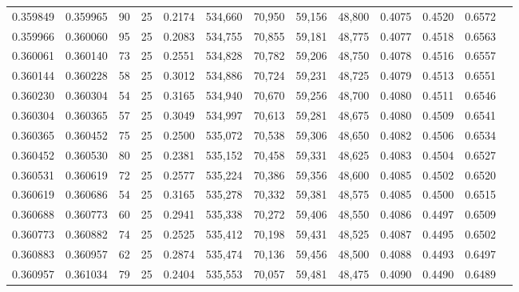 \begin{tabular}{rrrrrrrrrrrrr}
0.359849 & 0.359965 &    90 &  25 &                                     0.2174 & 534,660 &  70,950 &  59,156 &  48,800 & 0.4075 & 0.4520 & 0.6572 \\
0.359966 & 0.360060 &    95 &  25 &                                     0.2083 & 534,755 &  70,855 &  59,181 &  48,775 & 0.4077 & 0.4518 & 0.6563 \\
0.360061 & 0.360140 &    73 &  25 &                                     0.2551 & 534,828 &  70,782 &  59,206 &  48,750 & 0.4078 & 0.4516 & 0.6557 \\
0.360144 & 0.360228 &    58 &  25 &                                     0.3012 & 534,886 &  70,724 &  59,231 &  48,725 & 0.4079 & 0.4513 & 0.6551 \\
0.360230 & 0.360304 &    54 &  25 &                                     0.3165 & 534,940 &  70,670 &  59,256 &  48,700 & 0.4080 & 0.4511 & 0.6546 \\
0.360304 & 0.360365 &    57 &  25 &                                     0.3049 & 534,997 &  70,613 &  59,281 &  48,675 & 0.4080 & 0.4509 & 0.6541 \\
0.360365 & 0.360452 &    75 &  25 &                                     0.2500 & 535,072 &  70,538 &  59,306 &  48,650 & 0.4082 & 0.4506 & 0.6534 \\
0.360452 & 0.360530 &    80 &  25 &                                     0.2381 & 535,152 &  70,458 &  59,331 &  48,625 & 0.4083 & 0.4504 & 0.6527 \\
0.360531 & 0.360619 &    72 &  25 &                                     0.2577 & 535,224 &  70,386 &  59,356 &  48,600 & 0.4085 & 0.4502 & 0.6520 \\
0.360619 & 0.360686 &    54 &  25 &                                     0.3165 & 535,278 &  70,332 &  59,381 &  48,575 & 0.4085 & 0.4500 & 0.6515 \\
0.360688 & 0.360773 &    60 &  25 &                                     0.2941 & 535,338 &  70,272 &  59,406 &  48,550 & 0.4086 & 0.4497 & 0.6509 \\
0.360773 & 0.360882 &    74 &  25 &                                     0.2525 & 535,412 &  70,198 &  59,431 &  48,525 & 0.4087 & 0.4495 & 0.6502 \\
0.360883 & 0.360957 &    62 &  25 &                                     0.2874 & 535,474 &  70,136 &  59,456 &  48,500 & 0.4088 & 0.4493 & 0.6497 \\
0.360957 & 0.361034 &    79 &  25 &                                     0.2404 & 535,553 &  70,057 &  59,481 &  48,475 & 0.4090 & 0.4490 & 0.6489 \\

\end{tabular}
